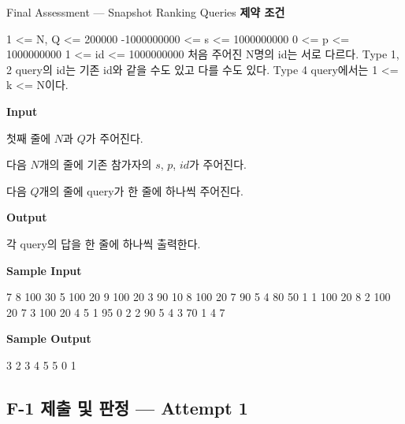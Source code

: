 \begin{problembox}{Final Assessment --- Snapshot Ranking Queries}
\textbf{제약 조건}
\begin{TextBlock}
1 <= N, Q <= 200000
-1000000000 <= s <= 1000000000
0 <= p <= 1000000000
1 <= id <= 1000000000
처음 주어진 N명의 id는 서로 다르다.
Type 1, 2 query의 id는 기존 id와 같을 수도 있고 다를 수도 있다.
Type 4 query에서는 1 <= k <= N이다.
\end{TextBlock}

\textbf{Input}

첫째 줄에 $N$과 $Q$가 주어진다.

다음 $N$개의 줄에 기존 참가자의 $s$, $p$, $id$가 주어진다.

다음 $Q$개의 줄에 query가 한 줄에 하나씩 주어진다.

\textbf{Output}

각 query의 답을 한 줄에 하나씩 출력한다.

\textbf{Sample Input}
\begin{TextBlock}
7 8
100 30 5
100 20 9
100 20 3
90 10 8
100 20 7
90 5 4
80 50 1
1 100 20 8
2 100 20 7
3 100 20
4 5
1 95 0 2
2 90 5 4
3 70 1
4 7
\end{TextBlock}

\textbf{Sample Output}
\begin{TextBlock}
3
2
3
4
5
5
0
1
\end{TextBlock}
\end{problembox}


\subsection{F-1 제출 및 판정 --- Attempt 1}

